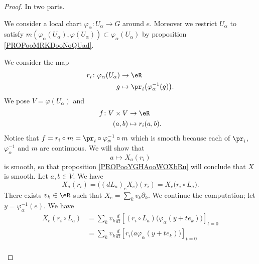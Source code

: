 \begin{proof}
	In two parts.
	\begin{subproof}
		\spitem[In a neighbourhood of \( e\)]
		We consider a local chart \(\varphi_{\alpha} \colon U_{\alpha}\to G  \) around \( e\). Moreover we restrict \( U_{\alpha}\) to satisfy \( m(\varphi_{\alpha}(U_{\alpha}),\varphi(U_{\alpha}))\subset\varphi_{\alpha}(U_{\alpha})\) by proposition \ref{PROPooMRKDooNoQUad}.

		We consider the map
		\begin{equation}
			\begin{aligned}
				r_i\colon \varphi_{\alpha}(U_{\alpha}) & \to  \eR                                           \\
				g                                      & \mapsto \pr_i\big( \varphi_{\alpha}^{-1}(g) \big).
			\end{aligned}
		\end{equation}
		We pose \( V=\varphi(U_{\alpha}) \) and
		\begin{equation}
			\begin{aligned}
				f\colon V\times V & \to \eR           \\
				(a,b)             & \mapsto r_i(a,b).
			\end{aligned}
		\end{equation}
		Notice that \( f=r_i\circ m=\pr_i\circ\varphi_{\alpha}^{-1}\circ m\) which is smooth because each of \( \pr_i\), \( \varphi_{\alpha}^{-1}\) and \( m\) are continuous. We will show that
		\begin{equation}
			a\mapsto X_a(r_i)
		\end{equation}
		is smooth, so that proposition \ref{PROPooYGHAooWOXbRu} will conclude that \( X\) is smooth. Let \( a,b\in V\). We have
		\begin{equation}
			X_a(r_i)=\big( (dL_a)_eX_e \big)(r_i)=X_e\big( r_i\circ L_a \big).
		\end{equation}
		There exists \( v_k\in \eR\) such that \( X_e=\sum_kv_k\partial_k\). We continue the computation; let \( y=\varphi_{\alpha}^{-1}(e)\). We have
		\begin{subequations}
			\begin{align}
				X_e(r_i\circ L_a) & =\sum_kv_k\frac{d}{dt} \left[ (r_i\circ L_a)\big( \varphi_{\alpha}(y+te_k) \big)  \right]_{t=0} \\
				                  & =\sum_kv_k\frac{d}{dt} \left[ r_i\big( a\varphi_{\alpha}(y+te_k) \big)  \right]_{t=0}           \\

\end{align}
\end{subequations}
\end{subproof}
\end{proof}
